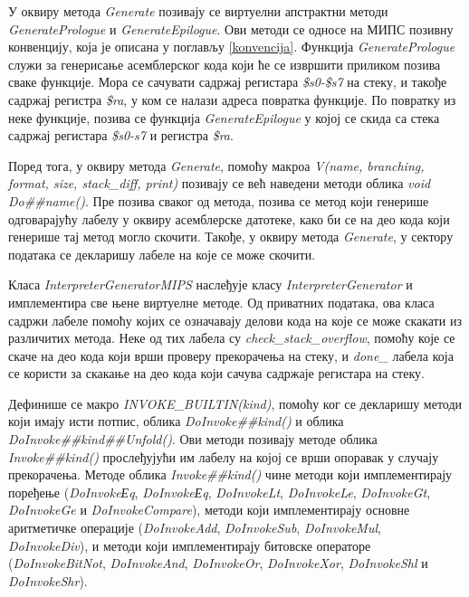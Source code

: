 \documentclass[12pt,oneside]{memoir}
\begin{document}
У оквиру метода \textit{Generate} позивају се виртуелни апстрактни методи \textit{Genera\-tePrologue} и \textit{GenerateEpilogue}. Ови методи се односе на МИПС позивну конвенцију, која је описана у поглављу \ref{konvencija}. Функција \textit{GeneratePrologue} служи за генерисање асемблерског кода који ће се извршити приликом позива сваке функције. Мора се сачувати садржај регистара \textit{\$s0-\$s7} на стеку, и такође садржај регистра \textit{\$ra}, у ком се налази адреса повратка функције. По повратку из неке функције, позива се функција \textit{GenerateEpilogue} у којој се скида са стека садржај регистара \textit{\$s0-s7} и регистра \textit{\$ra}.

Поред тога, у оквиру метода \textit{Generate}, помоћу макроа \textit{V(name, branching, format, size, stack\_diff, print)} позивају се већ наведени методи облика \textit{void Do\#\#name()}. Пре позива сваког од метода, позива се метод који генерише одговарајућу лабелу у оквиру асемблерске датотеке, како би се на део кода који генерише тај метод могло скочити. Такође, у оквиру метода \textit{Generate}, у сектору података се декларишу лабеле на које се може скочити.

Класа \textit{InterpreterGeneratorMIPS} наслеђује класу \textit{InterpreterGenerator} и имплементира све њене виртуелне методе. 
Од приватних података, ова класа садржи лабеле помоћу којих се означавају делови кода на које се може скакати из различитих метода. Неке од тих лабела су \textit{check\_stack\_overflow}, помоћу које се скаче на део кода који врши проверу прекорачења на стеку, и \textit{done\_} лабела која се користи за скакање на део кода који сачува садржаје регистара на стеку.

Дефинише се макро \textit{INVOKE\_BUILTIN(kind)}, помоћу ког се декларишу методи који имају исти потпис, облика \textit{DoInvoke\#\#kind()} и облика \textit{DoInvoke\#\#kind\#\#Unfold()}. Ови методи позивају методе облика \textit{Invoke\#\#kind()} прослеђујући им лабелу на којој се врши опоравак у случају прекорачења. Методе облика \textit{Invoke\#\#kind()} чине методи који имплементирају поређење (\textit{DoInvokeЕq}, \textit{DoInvokeЕq}, \textit{DoInvokeLt}, \textit{DoInvokeLe}, \textit{DoInvokeGt}, \textit{DoInvokeGe} и \textit{DoInvokeCompare}), методи који имплементирају основне аритметичке операције (\textit{DoInvokeAdd}, \textit{DoInvokeSub}, \textit{DoInvokeMul}, \textit{DoInvokeDiv}), и методи који имплементирају битовске операторе (\textit{DoInvokeBitNot}, \textit{DoInvokeAnd}, \textit{DoInvokeOr}, \textit{DoInvokeXor}, \textit{DoInvokeShl} и \textit{DoInvokeShr}). 
\end{document}
